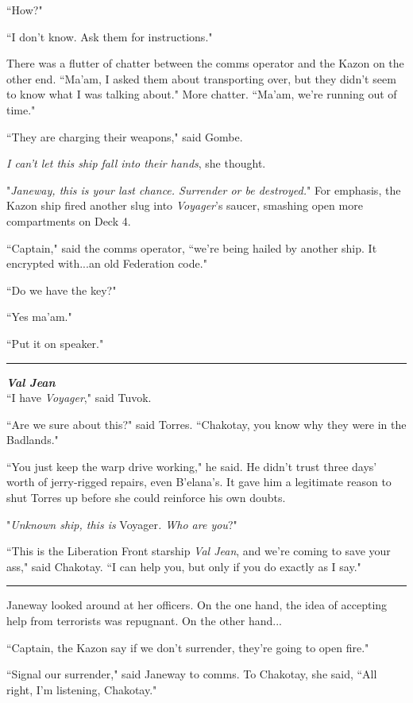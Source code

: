 \documentclass[twoside,letterpaper,12pt]{memoir}
\begin{document}
``How?"

``I don't know. Ask them for instructions."

There was a flutter of chatter between the comms operator and the Kazon on the other end. ``Ma'am, I asked them about transporting over, but they didn't seem to know what I was talking about." More chatter. ``Ma'am, we're running out of time."

``They are charging their weapons," said Gombe.

\textit{I can't let this ship fall into their hands}, she thought.

"\textit{Janeway, this is your last chance. Surrender or be destroyed.}" For emphasis, the Kazon ship fired another slug into \textit{Voyager}'s saucer, smashing open more compartments on Deck 4.

``Captain," said the comms operator, ``we're being hailed by another ship. It encrypted with...an old Federation code."

``Do we have the key?"

``Yes ma'am."

``Put it on speaker."

\fancybreak{\rule{3cm}{0.4 pt}}
\noindent\textit{\textbf{Val Jean}}\\

``I have \textit{Voyager}," said Tuvok.

``Are we sure about this?" said Torres. ``Chakotay, you know why they were in the Badlands."

``You just keep the warp drive working," he said. He didn't trust three days' worth of jerry-rigged repairs, even B'elana's. It gave him a legitimate reason to shut Torres up before she could reinforce his own doubts.

"\textit{Unknown ship, this is }Voyager\textit{. Who are you}?"

``This is the Liberation Front starship \textit{Val Jean}, and we're coming to save your ass," said Chakotay. ``I can help you, but only if you do exactly as I say."

\fancybreak{\rule{3cm}{0.4 pt}}
Janeway looked around at her officers. On the one hand, the idea of accepting help from terrorists was repugnant. On the other hand...

``Captain, the Kazon say if we don't surrender, they're going to open fire."

``Signal our surrender," said Janeway to comms. To Chakotay, she said, ``All right, I'm listening, Chakotay."
\end{document}

